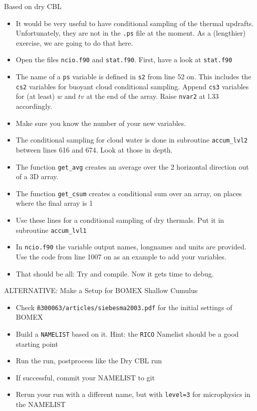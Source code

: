 \documentclass[handout]{beamer}
\newcommand{\code}[1]{{\tt #1}}
\begin{document}

\begin{frame}[allowframebreaks]{Based on dry CBL}
 \begin{itemize}
 \item It would be very useful to have conditional sampling of the thermal updrafts. Unfortunately, they are not in the \code{.ps} file at the moment. As a (lengthier) exercise, we are going to do that here.
 \item Open the files \code{ncio.f90} and \code{stat.f90}. First, have a look at \code{stat.f90}
 \item The name of a \code{ps} variable is defined in \code{s2} from line 52 on. This includes the \code{cs2} variables for buoyant cloud conditional sampling. Append \code{cs3} variables for (at least) $w$ and $tv$ at the end of the array. Raise \code{nvar2} at l.33 accordingly.
 \item Make sure you know the number of your new variables.
 \item The conditional sampling for cloud water is done in subroutine \code{accum\_lvl2} between lines 616 and 674. Look at those in depth.
 \item The function \code{get\_avg} creates an average over the 2 horizontal direction out of a 3D array.
 \item The function \code{get\_csum} creates a conditional sum over an array, on places where  the final array is 1
 \item Use these lines for a conditional sampling of dry thermals. Put it in subroutine \code{accum\_lvl1}
 \item In \code{ncio.f90} the variable output names, longnames and units are provided. Use the code from line 1007 on as an example to add your variables.
 \item That should be all: Try and compile. Now it gets time to debug.
 \end{itemize}

\end{frame}


\begin{frame}{ALTERNATIVE: Make a Setup for BOMEX Shallow Cumulus}
\begin{itemize}
 \item Check \code{\~m300063/articles/siebesma2003.pdf} for the initial settings of BOMEX
 \item Build a \code{NAMELIST} based on it. Hint: the \code{RICO} Namelist should be a good starting point
 \item Run the run, postprocess like the Dry CBL run
 \item If successful, commit your NAMELIST to git
 \item Rerun your run with a different name, but with \code{level=3} for microphysics in the NAMELIST
\end{itemize}
\end{frame}
\end{document}
